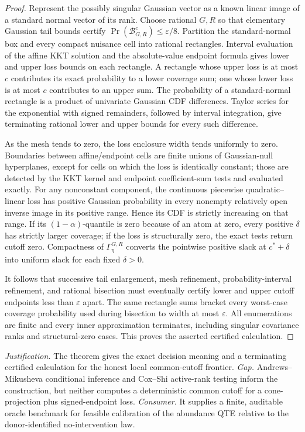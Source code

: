 \documentclass{article}
\begin{document}
\begin{proof}
Represent the possibly singular Gaussian vector as a known linear image of a standard normal vector of its rank.  Choose rational \(G,R\) so that elementary Gaussian tail bounds certify
\(\Pr(\mathcal B_{G,R}^c)\leq\varepsilon/8\).  Partition the standard-normal box and every compact nuisance cell into rational rectangles.  Interval evaluation of the affine KKT solution and the absolute-value endpoint formula gives lower and upper loss bounds on each rectangle.  A rectangle whose upper loss is at most \(c\) contributes its exact probability to a lower coverage sum; one whose lower loss is at most \(c\) contributes to an upper sum.  The probability of a standard-normal rectangle is a product of univariate Gaussian CDF differences.  Taylor series for the exponential with signed remainders, followed by interval integration, give terminating rational lower and upper bounds for every such difference.

As the mesh tends to zero, the loss enclosure width tends uniformly to zero.  Boundaries between affine/endpoint cells are finite unions of Gaussian-null hyperplanes, except for cells on which the loss is identically constant; those are detected by the KKT kernel and endpoint coefficient-sum tests and evaluated exactly.  For any nonconstant component, the continuous piecewise quadratic--linear loss has positive Gaussian probability in every nonempty relatively open inverse image in its positive range.  Hence its CDF is strictly increasing on that range.  If its \((1-\alpha)\)-quantile is zero because of an atom at zero, every positive \(\delta\) has strictly larger coverage; if the loss is structurally zero, the exact tests return cutoff zero.  Compactness of \(\Gamma_\eta^{G,R}\) converts the pointwise positive slack at \(c^*+\delta\) into uniform slack for each fixed \(\delta>0\).

It follows that successive tail enlargement, mesh refinement, probability-interval refinement, and rational bisection must eventually certify lower and upper cutoff endpoints less than \(\varepsilon\) apart.  The same rectangle sums bracket every worst-case coverage probability used during bisection to width at most \(\varepsilon\).  All enumerations are finite and every inner approximation terminates, including singular covariance ranks and structural-zero cases.  This proves the asserted certified calculation.
\end{proof}
\par\smallskip\noindent \textit{Justification.} The theorem gives the exact decision meaning and a terminating certified calculation for the honest local common-cutoff frontier. \textit{Gap.} Andrews--Mikusheva conditional inference and Cox--Shi active-rank testing inform the construction, but neither computes a deterministic common cutoff for a cone-projection plus signed-endpoint loss. \textit{Consumer.} It supplies a finite, auditable oracle benchmark for feasible calibration of the abundance QTE relative to the donor-identified no-intervention law.
\end{document}
